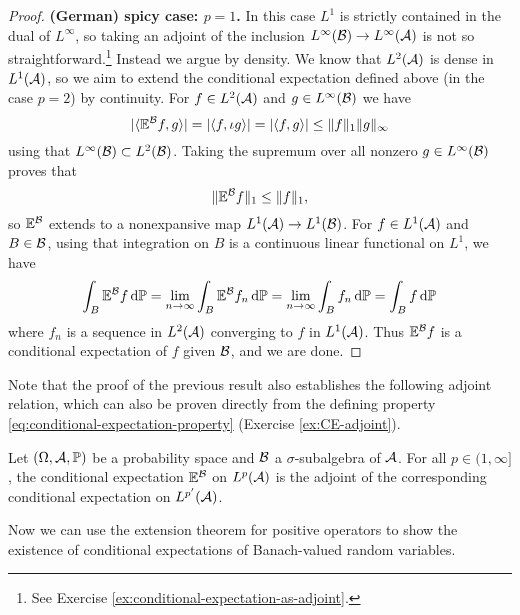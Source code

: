\begin{proof}
  \textbf{(German) spicy case: $p = 1$.} In this case $L^1$ is strictly contained in the dual of $L^\infty$, so taking an adjoint of the inclusion $L^\infty(\mathcal{B}) \to L^\infty(\mathcal{A})$ is not so straightforward.\footnote{See Exercise \ref{ex:conditional-expectation-as-adjoint}.} 
  Instead we argue by density.
  We know that $L^2(\mathcal{A})$ is dense in $L^1(\mathcal{A})$, so we aim to extend the conditional expectation defined above (in the case $p=2$) by continuity.
  For $f \in L^2(\mathcal{A})$ and $g \in L^\infty(\mathcal{B})$ we have
  \begin{equation*}
    |\langle \mathbb{E}^{\mathcal{B}} f, g \rangle| = |\langle f, \iota g \rangle| = |\langle f, g \rangle| \leq \|f\|_1 \|g\|_\infty
  \end{equation*}
  using that $L^\infty(\mathcal{B}) \subset L^2(\mathcal{B})$.
  Taking the supremum over all nonzero $g \in L^\infty(\mathcal{B})$ proves that
  \begin{equation*}
    \|\mathbb{E}^{\mathcal{B}} f\|_1 \leq \|f\|_1,
  \end{equation*}
  so $\mathbb{E}^{\mathcal{B}}$ extends to a nonexpansive map $L^1(\mathcal{A}) \to L^1(\mathcal{B})$.
  For $f \in L^1(\mathcal{A})$ and $B \in \mathcal{B}$, using that integration on $B$ is a continuous linear functional on $L^1$, we have
  \begin{equation*}
    \int_B \mathbb{E}^{\mathcal{B}} f \, \mathrm{d}\mathbb{P}
    = \lim_{n \to \infty} \int_B \mathbb{E}^{\mathcal{B}} f_n \, \mathrm{d}\mathbb{P}
    = \lim_{n \to \infty} \int_B  f_n \, \mathrm{d}\mathbb{P}
    = \int_B f \, \mathrm{d}\mathbb{P}
  \end{equation*}
  where $f_n$ is a sequence in $L^2(\mathcal{A})$ converging to $f$ in $L^1(\mathcal{A})$.
  Thus $\mathbb{E}^{\mathcal{B}}f$ is a conditional expectation of $f$ given $\mathcal{B}$, and we are done.
\end{proof}

Note that the proof of the previous result also establishes the following adjoint relation, which can also be proven directly from the defining property \eqref{eq:conditional-expectation-property} (Exercise \ref{ex:CE-adjoint}).

\begin{prop}\label{prop:CE-adjoint}
  Let $(\Omega,\mathcal{A},\mathbb{P})$ be a probability space and $\mathcal{B}$ a $\sigma$-subalgebra of $\mathcal{A}$.
  For all $p \in (1,\infty]$, the conditional expectation $\mathbb{E}^{\mathcal{B}}$ on $L^p(\mathcal{A})$ is the adjoint of the corresponding conditional expectation on $L^{p'}(\mathcal{A})$.
\end{prop}

Now we can use the extension theorem for positive operators to show the existence of conditional expectations of Banach-valued random variables.

